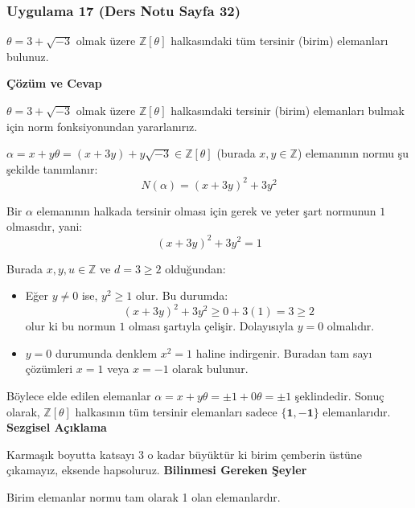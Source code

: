 \documentclass[11pt, a4paper]{article}
\newenvironment{cozum}{
    \vspace{0.5cm}
    \noindent\textcolor{green!60!black}{\faCheckCircle\enspace \textbf{\Large Çözüm ve Cevap}}\par\vspace{0.2cm}
}{}
\newenvironment{sezgisel}{
    \vspace{0.5cm}
    \noindent\textcolor{orange!80!black}{\faLightbulb\enspace \textbf{\Large Sezgisel Açıklama}}\par\vspace{0.2cm}
    \itshape
}{}
\newenvironment{bilgi}{
    \vspace{0.5cm}
    \noindent\textcolor{red!70!black}{\faExclamationTriangle\enspace \textbf{\Large Bilinmesi Gereken Şeyler}}\par\vspace{0.2cm}
}{}
\begin{document}
\subsubsection{Uygulama 17 (Ders Notu Sayfa 32)}
\begin{sorubox}
$\theta = 3 + \sqrt{-3}$ olmak üzere $\mathbb{Z}[\theta]$ halkasındaki tüm tersinir (birim) elemanları bulunuz.
\end{sorubox}
\begin{cozum}
$\theta = 3 + \sqrt{-3}$ olmak üzere $\mathbb{Z}[\theta]$ halkasındaki tersinir (birim) elemanları bulmak için norm fonksiyonundan yararlanırız.

$\alpha = x + y\theta = (x + 3y) + y\sqrt{-3} \in \mathbb{Z}[\theta]$ (burada $x, y \in \mathbb{Z}$) elemanının normu şu şekilde tanımlanır:
\[ N(\alpha) = (x + 3y)^2 + 3 y^2 \]

Bir $\alpha$ elemanının halkada tersinir olması için gerek ve yeter şart normunun $1$ olmasıdır, yani:
\[ (x + 3y)^2 + 3 y^2 = 1 \]

Burada $x, y, u \in \mathbb{Z}$ ve $d = 3 \ge 2$ olduğundan:
\begin{itemize}
    \item Eğer $y \neq 0$ ise, $y^2 \ge 1$ olur. Bu durumda:
    \[ (x + 3y)^2 + 3 y^2 \ge 0 + 3(1) = 3 \ge 2 \]
    olur ki bu normun $1$ olması şartıyla çelişir. Dolayısıyla $y = 0$ olmalıdır.
    \item $y = 0$ durumunda denklem $x^2 = 1$ haline indirgenir. Buradan tam sayı çözümleri $x = 1$ veya $x = -1$ olarak bulunur.
\end{itemize}

Böylece elde edilen elemanlar $\alpha = x + y\theta = \pm 1 + 0\theta = \pm 1$ şeklindedir. Sonuç olarak, $\mathbb{Z}[\theta]$ halkasının tüm tersinir elemanları sadece $\mathbf{\{1, -1\}}$ elemanlarıdır.
\end{cozum}
\begin{sezgisel}
Karmaşık boyutta katsayı 3 o kadar büyüktür ki birim çemberin üstüne çıkamayız, eksende hapsoluruz.
\end{sezgisel}
\begin{bilgi}
Birim elemanlar normu tam olarak 1 olan elemanlardır.
\end{bilgi}

\newpage
\end{document}
